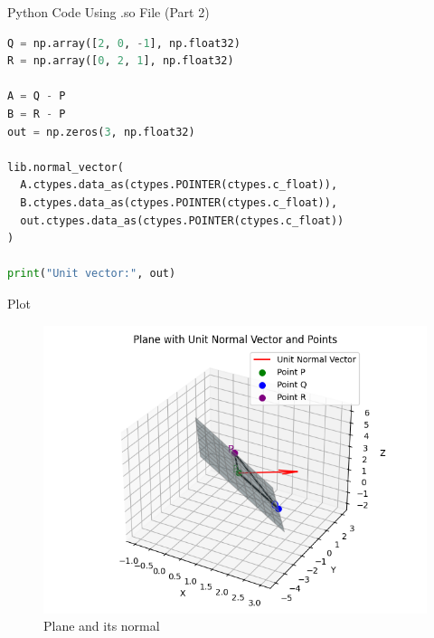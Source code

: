 \documentclass{beamer}
\begin{document}
\begin{frame}[fragile]{Python Code Using .so File (Part 2)}
\begin{lstlisting}[language=Python]
Q = np.array([2, 0, -1], np.float32)
R = np.array([0, 2, 1], np.float32)

A = Q - P
B = R - P
out = np.zeros(3, np.float32)

lib.normal_vector(
  A.ctypes.data_as(ctypes.POINTER(ctypes.c_float)),
  B.ctypes.data_as(ctypes.POINTER(ctypes.c_float)),
  out.ctypes.data_as(ctypes.POINTER(ctypes.c_float))
)

print("Unit vector:", out)
\end{lstlisting}
\end{frame}






\begin{frame}{Plot}
\begin{figure}[H]
    \centering
    \includegraphics[width=0.78\linewidth]{Figs/fig1.png}
    \caption{Plane and its normal}
    \label{fig:fig1}
\end{figure}
\end{frame}
\end{document}
